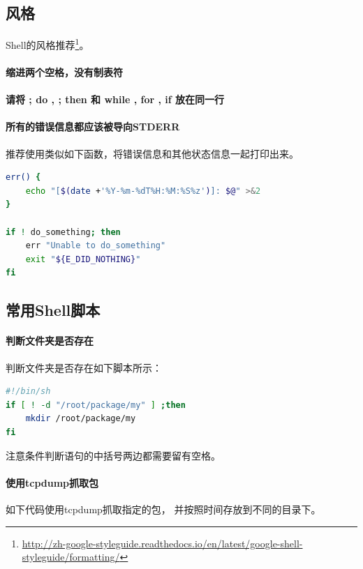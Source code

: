 \documentclass{book}
\begin{document}
\subsection{风格}

Shell的风格推荐\footnote{\url{http://zh-google-styleguide.readthedocs.io/en/latest/google-shell-styleguide/formatting/}}。

\paragraph{缩进两个空格，没有制表符}
\paragraph{请将 ; do , ; then 和 while , for , if 放在同一行}
\paragraph{所有的错误信息都应该被导向STDERR}
推荐使用类似如下函数，将错误信息和其他状态信息一起打印出来。

\begin{lstlisting}[language=Bash]
err() {
	echo "[$(date +'%Y-%m-%dT%H:%M:%S%z')]: $@" >&2
}

if ! do_something; then
	err "Unable to do_something"
	exit "${E_DID_NOTHING}"
fi
\end{lstlisting}

\subsection{常用Shell脚本}

\paragraph{判断文件夹是否存在}判断文件夹是否存在如下脚本所示：

\begin{lstlisting}[language=Bash]
#!/bin/sh
if [ ! -d "/root/package/my" ] ;then
	mkdir /root/package/my
fi
\end{lstlisting}

注意条件判断语句的中括号两边都需要留有空格。

\paragraph{使用tcpdump抓取包}

如下代码使用tcpdump抓取指定的包，
并按照时间存放到不同的目录下。
\end{document}
